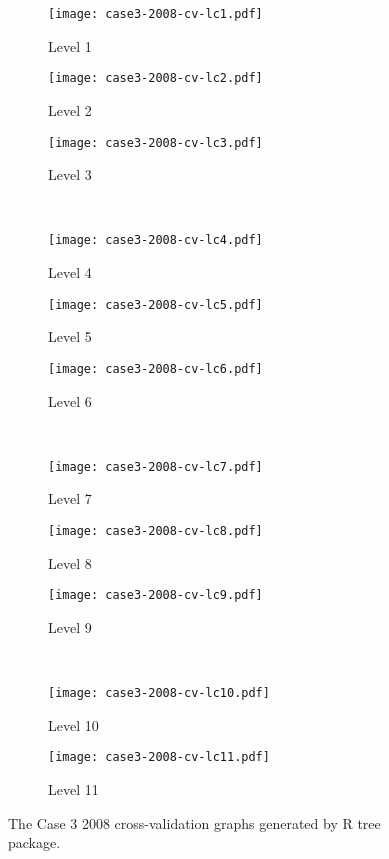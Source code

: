 \begin{appendices}
\begin{figure}[!ht] \centering
	\captionsetup[subfigure]{width=2.0in}
	\begin{subfigure}[t]{0.32\textwidth}
		\texttt{[image: case3-2008-cv-lc1.pdf]}
		\caption{Level 1}
	\end{subfigure}
	\begin{subfigure}[t]{0.32\textwidth}
		\texttt{[image: case3-2008-cv-lc2.pdf]}
		\caption{Level 2}
	\end{subfigure}
	\begin{subfigure}[t]{0.32\textwidth}
		\texttt{[image: case3-2008-cv-lc3.pdf]}
		\caption{Level 3}
	\end{subfigure}\\
	\vspace{5pt}
	\begin{subfigure}[t]{0.32\textwidth}
		\texttt{[image: case3-2008-cv-lc4.pdf]}
		\caption{Level 4}
	\end{subfigure}
	\begin{subfigure}[t]{0.32\textwidth}
		\texttt{[image: case3-2008-cv-lc5.pdf]}
		\caption{Level 5}
	\end{subfigure}
	\begin{subfigure}[t]{0.32\textwidth}
		\texttt{[image: case3-2008-cv-lc6.pdf]}
		\caption{Level 6}
	\end{subfigure}\\
	\vspace{5pt}	
	\begin{subfigure}[t]{0.32\textwidth}
		\texttt{[image: case3-2008-cv-lc7.pdf]}
		\caption{Level 7}
	\end{subfigure}
	\begin{subfigure}[t]{0.32\textwidth}
		\texttt{[image: case3-2008-cv-lc8.pdf]}
		\caption{Level 8}
	\end{subfigure}
	\begin{subfigure}[t]{0.32\textwidth}
		\texttt{[image: case3-2008-cv-lc9.pdf]}
		\caption{Level 9}
	\end{subfigure}\\
	\vspace{5pt}
	\begin{subfigure}[t]{0.32\textwidth}
		\texttt{[image: case3-2008-cv-lc10.pdf]}
		\caption{Level 10}
	\end{subfigure}
	\begin{subfigure}[t]{0.32\textwidth}
		\texttt{[image: case3-2008-cv-lc11.pdf]}
		\caption{Level 11}
	\end{subfigure}
	\vspace{5pt}
	\caption[The Case 3 2008 cross-validation graphs generated by R tree package.]{The Case 3 2008 cross-validation graphs generated by R tree package.}
	\label{fig: appendix-fig.c20.cv}
\end{figure}


\end{appendices}
